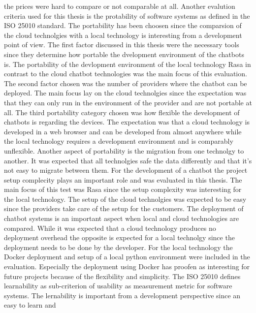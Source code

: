 the prices were hard to compare or not comparable at all.
Another evalution criteria used for this thesis is the protability of 
software systems as defined in the ISO 25010\cite{iso25010} standard.
The portability has been choosen since the comparsion of the cloud 
technolgies with a local technology is interesting from a 
development point of view.
The first factor discussed in this thesis were the necessary tools 
since they determine how portable the dvelopment environment of the 
chatbots is.
The portability of the devlopment environment of the local technology 
Rasa in contrast to the cloud chatbot technologies was the 
main focus of this evaluation.
The second factor chosen was the number of providers where the 
chatbot can be deployed.
The main focus lay on the cloud technolgies since the expectation was
that they can only run in the environment of the provider and are 
not portable at all.
The third portability category chosen was how flexible the development
of chatbots is regarding the devices.
The expectation was that a cloud technology is developed in a 
web browser and can be developed from almost anywhere while 
the local technology requires a development environment and is 
comparably unflexible.
Another aspect of portability is the migration from one technolgy to another.
It was expected that all technolgies safe the data differently and that it's not 
easy to migrate between them.
For the development of a chatbot the project setup complecity plays an important 
role and was evaluated in this thesis.
The main focus of this test was Rasa since the setup complexity was interesting 
for the local technology.
The setup of the cloud technolgies was expected to be easy since the providers 
take care of the setup for the customers.
The deployment of chatbot systems is an important aspect when local and cloud 
technologies are compared.
While it was expected that a cloud technology produces no deployment overhead 
the opposite is expected for a local technolgy since the deployment needs to 
be done by the developer.
For the local technology the Docker deployment and setup of a local python 
environment were included in the evaluation.
Especially the deployment using Docker has proofen as interesting for 
future projects because of the flexibility and simplicity. 
The ISO 25010\cite{iso25010} defines learnability as sub-criterion of usability as measurement
metric for software systems.
The lernability is important from a development perspective since an easy to learn and 
